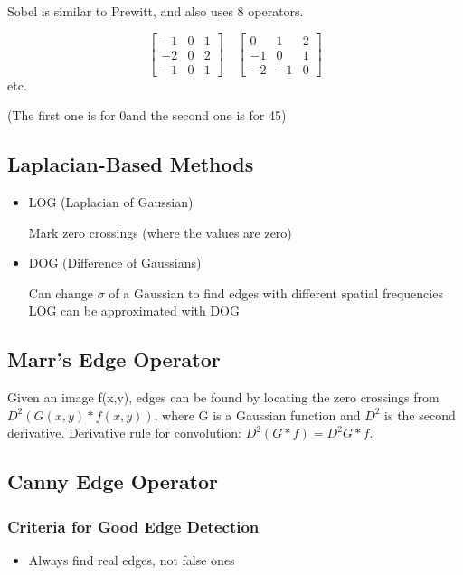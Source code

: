 \documentclass{article}
\begin{document}
\begin{multicols}{2}
Sobel is similar to Prewitt, and also uses 8 operators.

        \[
          \begin{bmatrix}
            -1 & 0 & 1\\
            -2 & 0 & 2\\
            -1 & 0 & 1
          \end{bmatrix}\quad
          \begin{bmatrix}
            0 & 1 & 2\\
            -1 & 0 & 1\\
            -2 & -1 & 0
          \end{bmatrix}
        \]
etc.

(The first one is for 0\textdegree and the second one is for 45\textdegree)

\subsection{Laplacian-Based Methods}

\begin{itemize}
  \item {LOG (Laplacian of Gaussian)}
  
  Mark zero crossings (where the values are zero)
  \item {DOG (Difference of Gaussians)}
  
  Can change $\sigma$ of a Gaussian to find edges with different spatial frequencies
  LOG can be approximated with DOG
\end{itemize}

\subsection{Marr's Edge Operator}

Given an image f(x,y), edges can be found by locating the zero crossings from \(D^2(G(x,y)*f(x,y))\), where G is a Gaussian function and $D^2$ is the second derivative.
Derivative rule for convolution: \(D^2(G*f) = D^2G * f\).

\subsection{Canny Edge Operator}

\subsubsection{Criteria for Good Edge Detection}
\begin{itemize}
      \item Always find real edges, not false ones
  

\end{itemize}
\end{multicols}
\end{document}
